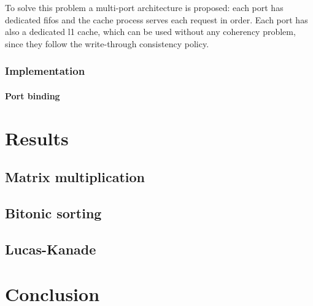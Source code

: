 \documentclass[11pt,a4paper,oneside]{memoir}
\begin{document}
To solve this problem a multi-port architecture is proposed: each port has
dedicated \acp{fifo} and the cache process serves each request in order.
Each port has also a dedicated \ac{l1} cache, which can be used without any
coherency problem, since they follow the write-through consistency policy.

\subsection{Implementation}
\subsubsection{Port binding}


\chapter{Results}
\section{Matrix multiplication}
\section{Bitonic sorting}
\section{Lucas-Kanade}

\chapter{Conclusion}

\printbibliography
\end{document}
